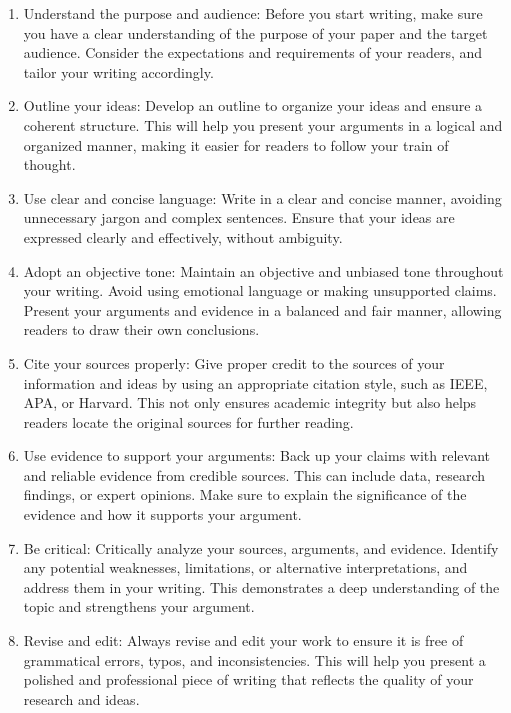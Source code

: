\begin{enumerate}
    \item Understand the purpose and audience: Before you start writing, make sure you have a clear understanding of the purpose of your paper and the target audience. Consider the expectations and requirements of your readers, and tailor your writing accordingly.

    \item Outline your ideas: Develop an outline to organize your ideas and ensure a coherent structure. This will help you present your arguments in a logical and organized manner, making it easier for readers to follow your train of thought.

    \item Use clear and concise language: Write in a clear and concise manner, avoiding unnecessary jargon and complex sentences. Ensure that your ideas are expressed clearly and effectively, without ambiguity.

    \item Adopt an objective tone: Maintain an objective and unbiased tone throughout your writing. Avoid using emotional language or making unsupported claims. Present your arguments and evidence in a balanced and fair manner, allowing readers to draw their own conclusions.
    
    \item Cite your sources properly: Give proper credit to the sources of your information and ideas by using an appropriate citation style, such as IEEE, APA, or Harvard. This not only ensures academic integrity but also helps readers locate the original sources for further reading.

    \item Use evidence to support your arguments: Back up your claims with relevant and reliable evidence from credible sources. This can include data, research findings, or expert opinions. Make sure to explain the significance of the evidence and how it supports your argument.
    
    \item Be critical: Critically analyze your sources, arguments, and evidence. Identify any potential weaknesses, limitations, or alternative interpretations, and address them in your writing. This demonstrates a deep understanding of the topic and strengthens your argument.

    \item Revise and edit: Always revise and edit your work to ensure it is free of grammatical errors, typos, and inconsistencies. This will help you present a polished and professional piece of writing that reflects the quality of your research and ideas.
    

\end{enumerate}
